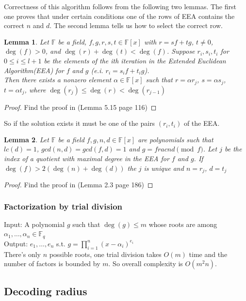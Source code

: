 \documentclass[12pt]{article}
\newtheorem{lemma}{Lemma}
\begin{document}
Correctness of this algorithm follows from the following two lemmas. The first one proves that under certain conditions one of the rows of EEA contains the correct $n$ and $d$. The second lemma tells us how to select the correct row.

\begin{lemma}
Let $\mathbb{F}$ be a field, $f, g, r, s, t \in \mathbb{F}[x]$ with $r = sf + tg$, $t \neq 0$, $\deg(f) > 0$, and $\deg(r) + \deg(t) <\deg(f)$.
Suppose $r_i, s_i, t_i$ for $0 \leq i \leq l + 1$ be the elements of the ith iteration in the Extended Euclidean Algorithm(EEA) for $f$ and $g$ (e.i. $r_i = s_if + t_ig$). \\
Then there exists a nonzero element $\alpha \in \mathbb{F}[x]$ such that $r = \alpha r_j$, $s = \alpha s_j$, $t = \alpha t_j$, where $\deg(r_j) \leq \deg(r) < \deg(r_{j-1})$
\end{lemma}
\begin{proof}
Find the proof in \cite{[GG13]} (Lemma 5.15 page 116)
\end{proof}

So if the solution exists it must be one of the pairs $(r_i, t_i)$ of the EEA.

\begin{lemma}
Let $\mathbb{F}$ be a field $f,g,n,d \in \mathbb{F}[x]$ are polynomials such that $lc(d) = 1$, $gcd(n,d) = gcd(f,d) = 1$ and $g = frac{n}{d} \pmod{f}$. Let $j$ be the index of a quotient with maximal degree in the EEA for $f$ and $g$. If $\deg(f) > 2(\deg(n) + \deg(d))$ the $j$ is unique and $n = r_j$, $d = t_j$
\end{lemma}
\begin{proof}
Find the proof in \cite{[KM06]} (Lemma 2.3 page 186)
\end{proof}


\subsubsection{Factorization by trial division}
\label{subsubsec:factoring_polynomials}
Input: A polynomial $g$ such that $\deg(g) \leq m$ whose roots are among $\alpha_1, \dots , \alpha_n \in \mathbb{F}_q$\\
Output: $e_1, \dots , e_n$ s.t. $g = \prod_{i = 1}^{n}(x - \alpha_i)^{e_i}$\\
There's only $n$ possible roots, one trial division takes $O(m)$ time and the number of factors is bounded by $m$. So overall complexity is $O(m^2n)$.


\subsection{Decoding radius}
\label{subsec:radius_polynomials}
\end{document}
